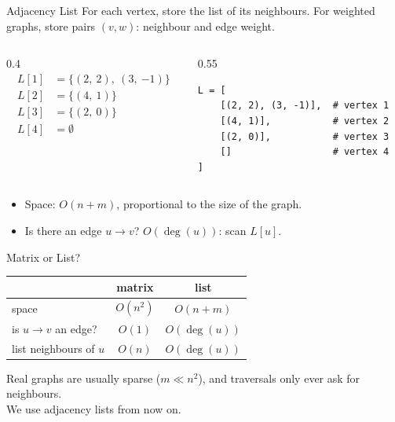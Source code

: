 \documentclass[10pt,aspectratio=169]{beamer}
\begin{document}
\begin{frame}[fragile]{Adjacency List}
  For each vertex, store the list of its neighbours. For weighted graphs, store
  pairs $(v, w)$: neighbour and edge weight.

  \bigskip
  \begin{columns}[c]
    \begin{column}{0.4\textwidth}
      \[
        \begin{aligned}
          L[1] &= \{(2,\ 2),\ (3,\ {-1})\} \\
          L[2] &= \{(4,\ 1)\} \\
          L[3] &= \{(2,\ 0)\} \\
          L[4] &= \emptyset
        \end{aligned}
      \]
    \end{column}
    \begin{column}{0.55\textwidth}
\begin{lstlisting}
L = [
    [(2, 2), (3, -1)],  # vertex 1
    [(4, 1)],           # vertex 2
    [(2, 0)],           # vertex 3
    []                  # vertex 4
]
\end{lstlisting}
    \end{column}
  \end{columns}

  \bigskip
  \pause
  \begin{itemize}
    \item Space: $O(n + m)$, proportional to the size of the graph.
    \item Is there an edge $u \to v$? $O(\deg(u))$: scan $L[u]$.
  \end{itemize}
\end{frame}

\begin{frame}{Matrix or List?}
  \begin{center}
  \begin{tabular}{lcc}
    \toprule
                         & matrix   & list \\
    \midrule
    space                & $O(n^2)$ & $O(n + m)$ \\
    is $u \to v$ an edge? & $O(1)$   & $O(\deg(u))$ \\
    list neighbours of $u$ & $O(n)$  & $O(\deg(u))$ \\
    \bottomrule
  \end{tabular}
  \end{center}

  \bigskip
  \begin{center}
    Real graphs are usually sparse ($m \ll n^2$), and traversals only ever
    ask for neighbours.\\[4pt]
    \alert{We use adjacency lists from now on.}
  \end{center}
\end{frame}
\end{document}
